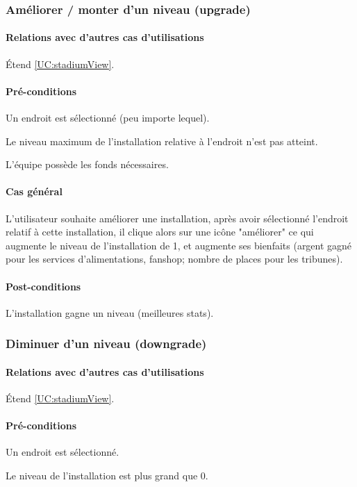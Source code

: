 \subsubsection{Améliorer / monter d'un niveau (upgrade)}
\label{UC:upgrade}
\paragraph{Relations avec d'autres cas d'utilisations}
Étend \ref{UC:stadiumView}.
\paragraph{Pré-conditions}
\begin{list}{}{\leftmargin=1.5em}
\item{Un endroit est sélectionné (peu importe lequel).}
\item{Le niveau maximum de l'installation relative à l'endroit n'est pas atteint.}
\item{L'équipe possède les fonds nécessaires.}
\end{list}
\paragraph{Cas général}
L'utilisateur souhaite améliorer une installation, après avoir sélectionné l'endroit relatif à cette installation, il clique alors sur une icône "améliorer" ce qui augmente le niveau de l'installation de 1, et augmente ses bienfaits (argent gagné pour les services d'alimentations, fanshop; nombre de places pour les tribunes).
\paragraph{Post-conditions}
\begin{list}{}{\leftmargin=1.5em}
\item{L'installation gagne un niveau (meilleures stats).}
\end{list}

\subsubsection{Diminuer d'un niveau (downgrade)}
\label{UC:downgrade}
\paragraph{Relations avec d'autres cas d'utilisations}
Étend \ref{UC:stadiumView}.
\paragraph{Pré-conditions}
\begin{list}{}{\leftmargin=1.5em}
\item{Un endroit est sélectionné.}
\item{Le niveau de l'installation est plus grand que 0.}
\end{list}
